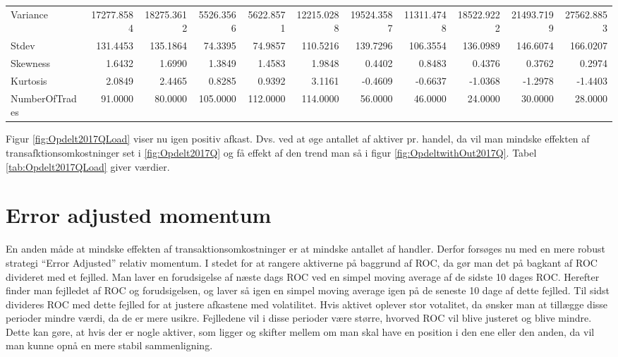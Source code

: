 \documentclass[]{article}
\begin{document}
\begin{table}
{\begin{tabular}[t]{lrrrrrrrrrr}
Variance & 17277.8584 & 18275.3612 & 5526.3566 & 5622.8571 & 12215.0288 & 19524.3587 & 11311.4748 & 18522.9222 & 21493.7199 & 27562.8853\\
Stdev & 131.4453 & 135.1864 & 74.3395 & 74.9857 & 110.5216 & 139.7296 & 106.3554 & 136.0989 & 146.6074 & 166.0207\\
Skewness & 1.6432 & 1.6990 & 1.3849 & 1.4583 & 1.9848 & 0.4402 & 0.8483 & 0.4376 & 0.3762 & 0.2974\\
\addlinespace
Kurtosis & 2.0849 & 2.4465 & 0.8285 & 0.9392 & 3.1161 & -0.4609 & -0.6637 & -1.0368 & -1.2978 & -1.4403\\
NumberOfTrades & 91.0000 & 80.0000 & 105.0000 & 112.0000 & 114.0000 & 56.0000 & 46.0000 & 24.0000 & 30.0000 & 28.0000\\
\bottomrule
\end{tabular}}
\end{table}

Figur \ref{fig:Opdelt2017QLoad} viser nu igen positiv afkast. Dvs. ved
at øge antallet af aktiver pr. handel, da vil man mindske effekten af
transafktionsomkostninger set i \ref{fig:Opdelt2017Q} og få effekt af
den trend man så i figur \ref{fig:OpdeltwithOut2017Q}. Tabel
\ref{tab:Opdelt2017QLoad} giver værdier.

\hypertarget{error-adjusted-momentum}{%
\section{Error adjusted momentum}\label{error-adjusted-momentum}}

En anden måde at mindske effekten af transaktionsomkostninger er at
mindske antallet af handler. Derfor forsøges nu med en mere robust
strategi ``Error Adjusted'' relativ momentum. I stedet for at rangere
aktiverne på baggrund af ROC, da gør man det på bagkant af ROC divideret
med et fejlled. Man laver en forudsigelse af næste dags ROC ved en
simpel moving average af de sidste 10 dages ROC. Herefter finder man
fejlledet af ROC og forudsigelsen, og laver så igen en simpel moving
average igen på de seneste 10 dage af dette fejlled. Til sidst divideres
ROC med dette fejlled for at justere afkastene med volatilitet. Hvis
aktivet oplever stor votalitet, da ønsker man at tillægge disse perioder
mindre værdi, da de er mere usikre. Fejlledene vil i disse perioder være
større, hvorved ROC vil blive justeret og blive mindre. Dette kan gøre,
at hvis der er nogle aktiver, som ligger og skifter mellem om man skal
have en position i den ene eller den anden, da vil man kunne opnå en
mere stabil sammenligning.
\end{document}
